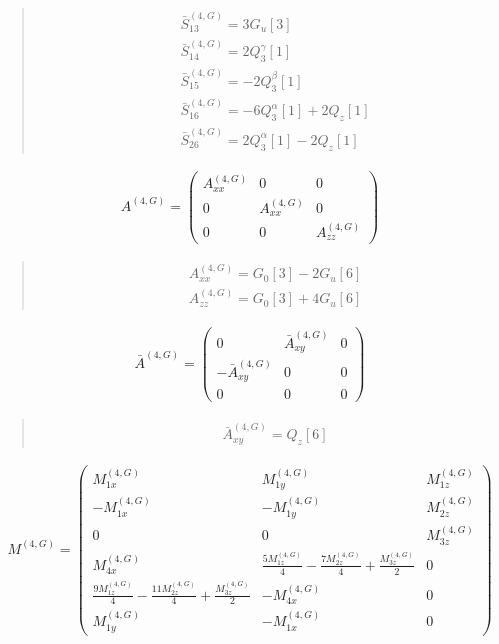 \documentclass[fleqn,10pt]{jsarticle}
\begin{document}
\begin{quote}
\begin{align*}
& \bar{S}^{(4,G)}_{13} = 3 G_{u}[3] \\
& \bar{S}^{(4,G)}_{14} = 2 Q_{3}^{\gamma}[1] \\
& \bar{S}^{(4,G)}_{15} = - 2 Q_{3}^{\beta}[1] \\
& \bar{S}^{(4,G)}_{16} = - 6 Q_{3}^{\alpha}[1] + 2 Q_{z}[1] \\
& \bar{S}^{(4,G)}_{26} = 2 Q_{3}^{\alpha}[1] - 2 Q_{z}[1]
\end{align*}
\end{quote}
\begin{align*}
A^{(4,G)} = \begin{pmatrix} A^{(4,G)}_{xx} & 0 & 0 \\ 0 & A^{(4,G)}_{xx} & 0 \\ 0 & 0 & A^{(4,G)}_{zz} \end{pmatrix}
\end{align*}
\begin{quote}
\begin{align*}
& A^{(4,G)}_{xx} = G_{0}[3] - 2 G_{u}[6] \\
& A^{(4,G)}_{zz} = G_{0}[3] + 4 G_{u}[6]
\end{align*}
\end{quote}
\begin{align*}
\bar{A}^{(4,G)} = \begin{pmatrix} 0 & \bar{A}^{(4,G)}_{xy} & 0 \\ - \bar{A}^{(4,G)}_{xy} & 0 & 0 \\ 0 & 0 & 0 \end{pmatrix}
\end{align*}
\begin{quote}
\begin{align*}
& \bar{A}^{(4,G)}_{xy} = Q_{z}[6]
\end{align*}
\end{quote}
\begin{align*}
M^{(4,G)} = \begin{pmatrix} M^{(4,G)}_{1x} & M^{(4,G)}_{1y} & M^{(4,G)}_{1z} \\ - M^{(4,G)}_{1x} & - M^{(4,G)}_{1y} & M^{(4,G)}_{2z} \\ 0 & 0 & M^{(4,G)}_{3z} \\ M^{(4,G)}_{4x} & \frac{5 M^{(4,G)}_{1z}}{4} - \frac{7 M^{(4,G)}_{2z}}{4} + \frac{M^{(4,G)}_{3z}}{2} & 0 \\ \frac{9 M^{(4,G)}_{1z}}{4} - \frac{11 M^{(4,G)}_{2z}}{4} + \frac{M^{(4,G)}_{3z}}{2} & - M^{(4,G)}_{4x} & 0 \\ M^{(4,G)}_{1y} & - M^{(4,G)}_{1x} & 0 \end{pmatrix}
\end{align*}
\end{document}
